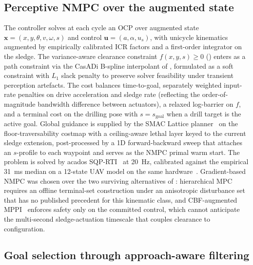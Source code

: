 \documentclass[11pt,a4paper]{article}
\begin{document}
\subsection{Perceptive NMPC over the augmented state}
\label{sec:meth:nmpc}

The controller solves at each cycle an OCP over augmented state $\mathbf{x} = (x, y, \theta, v, \omega, s)$ and control $\mathbf{u} = (a, \alpha, u_s)$, with unicycle kinematics augmented by empirically calibrated ICR factors and a first-order integrator on the sledge. The variance-aware clearance constraint $f(x, y, s) \geq 0$ () enters as a path constraint via the CasADi B-spline interpolant of , formulated as a soft constraint with $L_1$ slack penalty to preserve solver feasibility under transient perception artefacts. The cost balances time-to-goal, separately weighted input-rate penalties on drive acceleration and sledge rate (reflecting the order-of-magnitude bandwidth difference between actuators), a relaxed log-barrier on $f$, and a terminal cost on the drilling pose with $s = s_\mathrm{goal}$ when a drill target is the active goal. Global guidance is supplied by the SMAC Lattice planner~\cite{macenskiOpenSourceCostAwareKinematically2025} on the floor-traversability costmap with a ceiling-aware lethal layer keyed to the current sledge extension, post-processed by a 1D forward-backward sweep that attaches an $s$-profile to each waypoint and serves as the NMPC primal warm start. The problem is solved by acados SQP-RTI~\parencite{verschueren2022acados} at \SI{20}{\hertz}, calibrated against the empirical \SI{31}{\milli\second} median on a 12-state UAV model on the same hardware~\parencite{enrico2025nmpcmppi}. Gradient-based NMPC was chosen over the two surviving alternatives of : hierarchical MPC~\cite{bendersEmbeddedHierarchicalMPC2025} requires an offline terminal-set construction under an anisotropic disturbance set that has no published precedent for this kinematic class, and CBF-augmented MPPI~\cite{yin2023shieldmppi,parwana2025brmppi} enforces safety only on the committed control, which cannot anticipate the multi-second sledge-actuation timescale that couples clearance to configuration.

\subsection{Goal selection through approach-aware filtering}
\label{sec:meth:goals}
\end{document}
